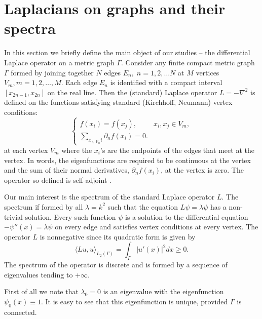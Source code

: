 \documentclass[a4paper]{article}
\begin{document}
\section{Laplacians on graphs and their spectra}

In this section we briefly define the main object of our studies -- the differential Laplace operator on a metric graph $ \Gamma. $
Consider any finite compact metric graph $ \Gamma $ formed by joining together $ N $ edges $ E_n, \; n=1,2, \dots N $ at $ M $
vertices $ V_m, m=1,2, \dots, M. $ Each edge $ E_n $ is identified with a compact interval $ [x_{2n-1}, x_{2n}] $ on the real line.
Then the (standard) Laplace operator $ L = - \nabla^2 $ is defined on the functions satisfying standard (Kirchhoff, Neumann) vertex conditions:
\begin{equation} \label{sc}
\left\{
\begin{array}{ll}
\displaystyle  f(x_i)=f(x_j), & x_i, x_j \in V_m, \\[3mm]
\displaystyle \sum_{x_{ \in V_m} i}\partial_{n}f(x_i)=0. &
\end{array} \right. 
\end{equation}
at each vertex $ V_m$ where the $x_i$'s are the endpoints of the edges that meet at the vertex. In words, the eigenfunctions are required to be
continuous at the vertex and the sum of their normal derivatives, $\partial_{n}f(x_i)$, at the vertex is zero. The operator so defined
is self-adjoint \cite{berkolaikokuchment,kostrykin1999kirchhoff}. 

 Our main interest is
the spectrum of the standard Laplace operator $ L$.  The spectrum if formed by all $ \lambda = k^2 $ such that the equation $ L \psi = \lambda \psi $
has a non-trivial solution. Every such function $ \psi $ is a solution to the differential equation $ - \psi'' (x) = \lambda \psi $ on every edge
and satisfies vertex conditions at every vertex. The operator $ L $ is nonnegative since its quadratic form is given by
$$ \langle L  u, u \rangle_{L_2(\Gamma)} = \int_\Gamma \vert u' (x) \vert^2 dx \geq 0. $$
The spectrum of the operator is discrete and is formed by a sequence of eigenvalues tending to $ + \infty. $

First of all we note that $ \lambda_0 = 0 $ is an eigenvalue with the eigenfunction $ \psi_0 (x) \equiv 1 $. It is easy to see that this eigenfunction is unique, provided $ \Gamma $ is connected.
\end{document}

